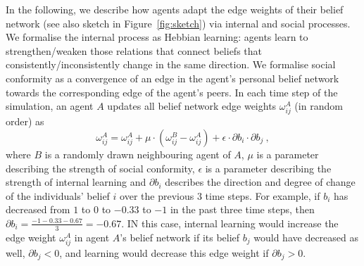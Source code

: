 In the following, we describe how agents adapt the edge weights of their belief network (see also sketch in Figure~\ref{fig:sketch}) via internal and social processes. We formalise the internal process as Hebbian learning: agents learn to strengthen/weaken those relations that connect beliefs that consistently/inconsistently change in the same direction. We formalise social conformity as a convergence of an edge in the agent's personal belief network towards the corresponding edge of the agent's peers. In each time step of the simulation, an agent $A$ updates all belief network edge weights $\omega_{ij}^A$ (in random order) as 
\begin{equation}
\omega_{ij}^A = \omega_{ij}^A + \mu \cdot (\omega_{ij}^B - \omega_{ij}^A) + \epsilon \cdot \partial b_{i} \cdot \partial b_{j} \ ,
\end{equation}
where $B$ is a randomly drawn neighbouring agent of $A$, $\mu$ is a parameter describing the strength of social conformity, $\epsilon$ is a parameter describing the strength of internal learning and $\partial b_i$ describes the direction and degree of change of the individuals' belief $i$ over the previous $3$ time steps. For example, if $b_i$ has decreased from $1$ to $0$ to $-0.33$ to $-1$ in the past three time steps, then $\partial b_i = \frac{-1-0.33-0.67}{3} = -0.67$. IN this case, internal learning would increase the edge weight $\omega_{ij}^A$ in agent $A$'s belief network if its belief $b_j$ would have decreased as well, $\partial b_j<0$, and learning would decrease this edge weight if $\partial b_j>0$. 


